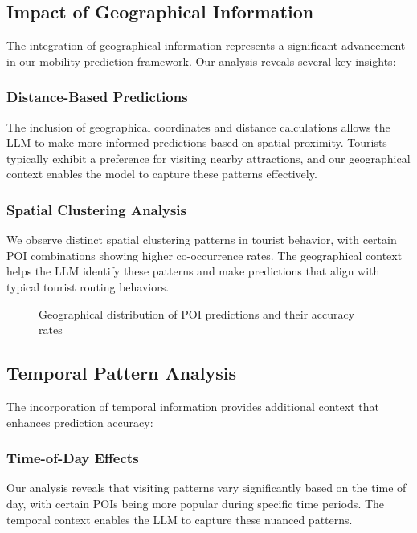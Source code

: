 \documentclass[12pt,a4paper]{article}
\begin{document}
\subsection{Impact of Geographical Information}

The integration of geographical information represents a significant advancement in our mobility prediction framework. Our analysis reveals several key insights:

\subsubsection{Distance-Based Predictions}
The inclusion of geographical coordinates and distance calculations allows the LLM to make more informed predictions based on spatial proximity. Tourists typically exhibit a preference for visiting nearby attractions, and our geographical context enables the model to capture these patterns effectively.

\subsubsection{Spatial Clustering Analysis}
We observe distinct spatial clustering patterns in tourist behavior, with certain POI combinations showing higher co-occurrence rates. The geographical context helps the LLM identify these patterns and make predictions that align with typical tourist routing behaviors.

\begin{figure}[H]
\centering
\caption{Geographical distribution of POI predictions and their accuracy rates}
\label{fig:geographical_analysis}
\end{figure}

\subsection{Temporal Pattern Analysis}

The incorporation of temporal information provides additional context that enhances prediction accuracy:

\subsubsection{Time-of-Day Effects}
Our analysis reveals that visiting patterns vary significantly based on the time of day, with certain POIs being more popular during specific time periods. The temporal context enables the LLM to capture these nuanced patterns.
\end{document}
